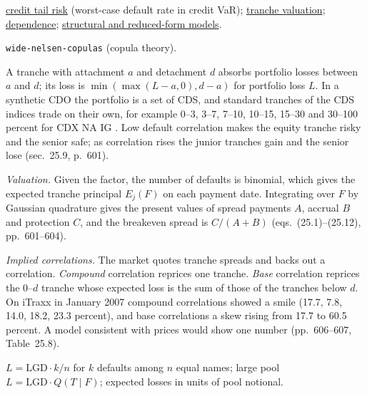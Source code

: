 \begin{qfmodel}
 \hyperref[meth:credit-liquidity-tail-risk]{credit tail risk} (worst-case default rate in credit VaR); \hyperref[meth:tranche-loss-base-correlation]{tranche valuation}; \hyperref[def:return-dependence]{dependence}; \hyperref[mod:structural-reduced-form-credit]{structural and reduced-form models}.

 \nolinkurl{wide-nelsen-copulas} (copula theory).

\end{qfmodel}

\begin{qfmethod}\label{meth:tranche-loss-base-correlation}
 A tranche with attachment $a$ and detachment $d$ absorbs portfolio losses between $a$ and $d$; its loss is $\min(\max(L-a,0),d-a)$ for portfolio loss $L$. In a synthetic CDO the portfolio is a set of CDS, and standard tranches of the CDS indices trade on their own, for example 0--3, 3--7, 7--10, 10--15, 15--30 and 30--100 percent for CDX NA IG \citep[chap.~25, sec.~25.8, pp.~599--600]{s7-hulloptions}. Low default correlation makes the equity tranche risky and the senior safe; as correlation rises the junior tranches gain and the senior lose (sec.~25.9, p.~601).

\emph{Valuation.} Given the factor, the number of defaults is binomial, which gives the expected tranche principal $E_j(F)$ on each payment date. Integrating over $F$ by Gaussian quadrature gives the present values of spread payments $A$, accrual $B$ and protection $C$, and the breakeven spread is $C/(A+B)$ (eqs.~(25.1)--(25.12), pp.~601--604).

\emph{Implied correlations.} The market quotes tranche spreads and backs out a correlation. \emph{Compound} correlation reprices one tranche. \emph{Base} correlation reprices the $0$--$d$ tranche whose expected loss is the sum of those of the tranches below $d$. On iTraxx in January 2007 compound correlations showed a smile (17.7, 7.8, 14.0, 18.2, 23.3 percent), and base correlations a skew rising from 17.7 to 60.5 percent. A model consistent with prices would show one number (pp.~606--607, Table~25.8).

 $L=\mathrm{LGD}\cdot k/n$ for $k$ defaults among $n$ equal names; large pool $L=\mathrm{LGD}\cdot Q(T\mid F)$; expected losses in units of pool notional.


\end{qfmethod}
